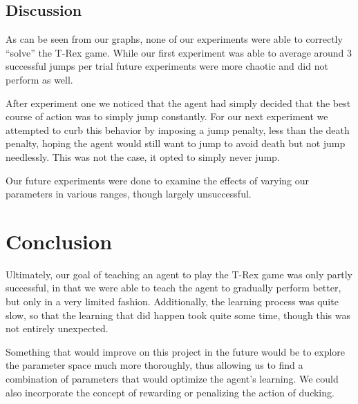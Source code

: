 \documentclass{scrartcl}
\begin{document}
    \subsection{Discussion}
    As can be seen from our graphs, none of our experiments were able to
    correctly ``solve'' the T-Rex game. While our first experiment was able to
    average around 3 successful jumps per trial future experiments were more
    chaotic and did not perform as well.

    After experiment one we noticed that the agent had simply decided that the
    best course of action was to simply jump constantly. For our next experiment
    we attempted to curb this behavior by imposing a jump penalty, less than the
    death penalty, hoping the agent would still want to jump to avoid death but
    not jump needlessly. This was not the case, it opted to simply never jump.

    Our future experiments were done to examine the effects of varying
    our parameters in various ranges, though largely unsuccessful.


\section{Conclusion}

    Ultimately, our goal of teaching an agent to play the T-Rex game was only
    partly successful, in that we were able to teach the agent to gradually
    perform better, but only in a very limited fashion. Additionally, the
    learning process was quite slow, so that the learning that did happen took
    quite some time, though this was not entirely unexpected.

    Something that would improve on this project in the future would be to
    explore the parameter space much more thoroughly, thus allowing us to find
    a combination of parameters that would optimize the agent's learning. We
    could also incorporate the concept of rewarding or penalizing the action of
    ducking.



\end{document}
